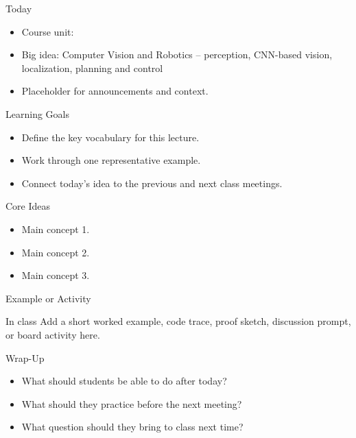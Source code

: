 \documentclass[aspectratio=169]{beamer}
\begin{document}
\makedecktitle

\begin{frame}{Today}
  \begin{itemize}
    \item Course unit: \CourseUnit
    \item Big idea: Computer Vision and Robotics -- perception, CNN-based vision, localization, planning and control
    \item Placeholder for announcements and context.
  \end{itemize}
\end{frame}

\begin{frame}{Learning Goals}
  \begin{itemize}
    \item Define the key vocabulary for this lecture.
    \item Work through one representative example.
    \item Connect today's idea to the previous and next class meetings.
  \end{itemize}
\end{frame}

\begin{frame}{Core Ideas}
  \placeholdernote
  \begin{itemize}
    \item Main concept 1.
    \item Main concept 2.
    \item Main concept 3.
  \end{itemize}
\end{frame}

\begin{frame}{Example or Activity}
  \begin{block}{In class}
    Add a short worked example, code trace, proof sketch, discussion prompt, or board activity here.
  \end{block}
\end{frame}

\begin{frame}{Wrap-Up}
  \begin{itemize}
    \item What should students be able to do after today?
    \item What should they practice before the next meeting?
    \item What question should they bring to class next time?
  \end{itemize}
\end{frame}
\end{document}
